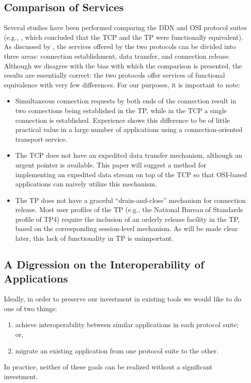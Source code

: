 \subsection	{Comparison of Services}
Several studies have been performed comparing the DDN and OSI protocol
suites
(e.g., \cite{NRC.Report}, which concluded that the TCP and the TP were
functionally equivalent).
As discussed by \cite{TCP.convert.ISO},
the services offered by the two protocols can be divided into three areas:
connection establishment, data transfer, and connection release.
Although we disagree with the bias with which the comparison is presented,
the results are essentially correct:
the two protocols offer services of functional equivalence with very few
differences.
For our purposes,
it is important to note:
\begin{itemize}
\item	Simultaneous connection requests by both ends of the connection
result in two connections being established in the TP,
while in the TCP a single connection is established.
Experience shows this difference to be of little practical value in
a large number of applications using a connection-oriented transport service.

\item	The TCP does not have an expedited data transfer mechanism,
although an urgent pointer is available.
This paper will suggest a method for implementing an expedited data stream on
top of the TCP so that OSI-based applications can naively utilize this
mechanism.

\item	The TP does not have a graceful ``drain-and-close'' mechanism for
connection release.
Most user profiles of the TP
(e.g., the National Bureau of Standards profile of TP4\cite{NBS.TP})
require the inclusion of an orderly release facility in the TP,
based on the corresponding session-level mechanism.
As will be made clear later,
this lack of functionality in TP is unimportant.
\end{itemize}

\subsection	{A Digression on the Interoperability of Applications}
Ideally,
in order to preserve our investment in existing tools
we would like to do one of two things:
\begin{enumerate}
\item	achieve interoperability between similar applications in each protocol
	suite;
	or,
\item	migrate an existing application from one protocol suite to the other.
\end{enumerate}
In practice,
neither of these goals can be realized without a significant investment.

